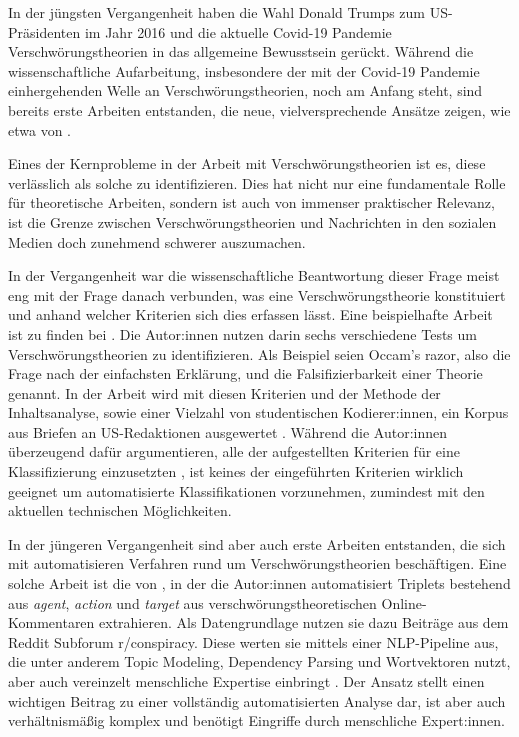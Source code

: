 In der jüngsten Vergangenheit haben die Wahl Donald Trumps zum US-Präsidenten im Jahr 2016 und die aktuelle Covid-19 Pandemie Verschwörungstheorien in das allgemeine Bewusstsein gerückt.
Während die wissenschaftliche Aufarbeitung, insbesondere der mit der Covid-19 Pandemie einhergehenden Welle an Verschwörungstheorien, noch am Anfang steht, sind bereits erste Arbeiten entstanden, die neue, vielversprechende Ansätze zeigen, wie etwa von \textcite{shahsavari_2020}.

Eines der Kernprobleme in der Arbeit mit Verschwörungstheorien ist es, diese verlässlich als solche zu identifizieren.
Dies hat nicht nur eine fundamentale Rolle für theoretische Arbeiten, sondern ist auch von immenser praktischer Relevanz, ist die Grenze zwischen Verschwörungstheorien und Nachrichten in den sozialen Medien doch zunehmend schwerer auszumachen.

In der Vergangenheit war die wissenschaftliche Beantwortung dieser Frage meist eng mit der Frage danach verbunden, was eine Verschwörungstheorie konstituiert und anhand welcher Kriterien sich dies erfassen lässt.
Eine beispielhafte Arbeit ist zu finden bei \textcite{uscinski_2014}.
Die Autor:innen nutzen darin sechs verschiedene Tests um Verschwörungstheorien zu identifizieren. Als Beispiel seien Occam's razor, also die Frage nach der einfachsten Erklärung, und die Falsifizierbarkeit einer Theorie genannt.
In der Arbeit wird mit diesen Kriterien und der Methode der Inhaltsanalyse, sowie einer Vielzahl von studentischen Kodierer:innen, ein Korpus aus Briefen an US-Redaktionen ausgewertet \parencite[54ff]{uscinski_2014}.
Während die Autor:innen überzeugend dafür argumentieren, alle der aufgestellten Kriterien für eine Klassifizierung einzusetzten \parencite[52f]{uscinski_2014}, ist keines der eingeführten Kriterien wirklich geeignet um automatisierte Klassifikationen vorzunehmen, zumindest mit den aktuellen technischen Möglichkeiten.

In der jüngeren Vergangenheit sind aber auch erste Arbeiten entstanden, die sich mit automatisieren Verfahren rund um Verschwörungstheorien beschäftigen.
Eine solche Arbeit ist die von \textcite{samory_2018}, in der die Autor:innen automatisiert Triplets bestehend aus \textit{agent}, \textit{action} und \textit{target} aus verschwörungstheoretischen Online-Kommentaren extrahieren.
Als Datengrundlage nutzen sie dazu Beiträge aus dem Reddit Subforum r/conspiracy.
Diese werten sie mittels einer NLP-Pipeline aus, die unter anderem Topic Modeling, Dependency Parsing und Wortvektoren nutzt, aber auch vereinzelt menschliche Expertise einbringt \parencite[][6ff]{samory_2018}.
Der Ansatz stellt einen wichtigen Beitrag zu einer vollständig automatisierten Analyse dar, ist aber auch verhältnismäßig komplex und benötigt Eingriffe durch menschliche Expert:innen.

